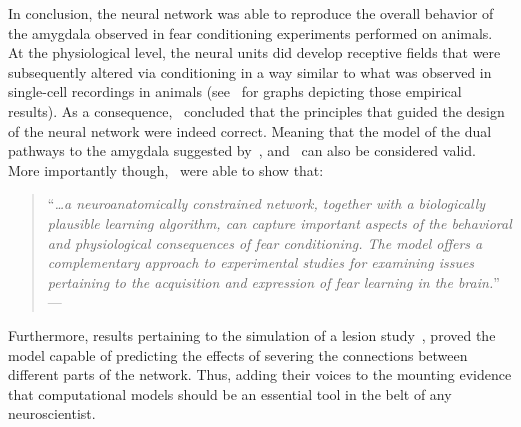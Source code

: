 In conclusion, the neural network was able to reproduce the overall behavior of the amygdala observed in fear conditioning experiments performed on animals. At the physiological level, the neural units did develop receptive fields that were subsequently altered via conditioning in a way similar to what was observed in single-cell recordings in animals (see~\citet{Armony1995} for graphs depicting those empirical results). As a consequence,~\citet{Armony1995} concluded that the principles that guided the design of the neural network were indeed correct. Meaning that the model of the dual pathways to the amygdala suggested by~\citet{Ledoux1992}, and~\citet{Romanski1992} can also be considered valid. More importantly though,~\citet{Armony1995} were able to show that:
\begin{quotation}
   ``\textit{\dots a neuroanatomically constrained network, together with a biologically plausible learning algorithm, can capture important aspects of the behavioral and physiological consequences of fear conditioning. The model offers a complementary approach to experimental studies for examining issues pertaining to the acquisition and expression of fear learning in the brain.}'' ---~\citet[p.~252]{Armony1995}
\end{quotation}
Furthermore, results pertaining to the simulation of a lesion study~\supercite{Armony1997,Armony1997a}, proved the model capable of predicting the effects of severing the connections between different parts of the network. Thus, adding their voices to the mounting evidence that computational models should be an essential tool in the belt of any neuroscientist.
